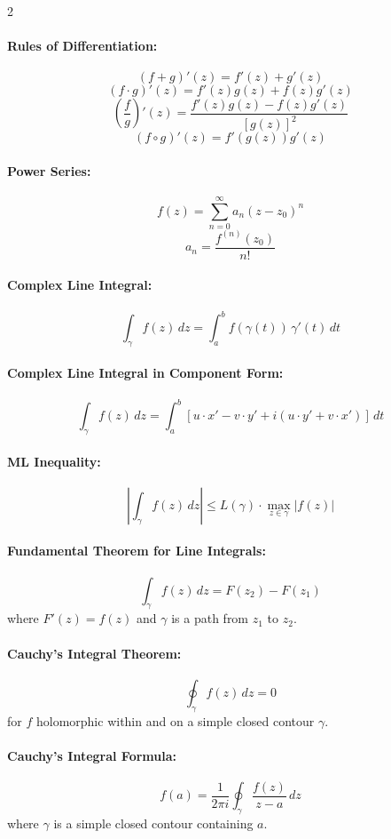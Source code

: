 \begin{multicols}{2}
\paragraph{Rules of Differentiation:}
\[
(f+g)'(z) = f'(z)+g'(z)
\]
\[
(f\cdot g)'(z) = f'(z)g(z)+f(z)g'(z)
\]
\[
\left(\frac{f}{g}\right)'(z) = \frac{f'(z)g(z)-f(z)g'(z)}{[g(z)]^2}
\]
\[
(f\circ g)'(z) = f'(g(z))g'(z)
\]

\paragraph{Power Series:}
\[
f(z) = \sum_{n=0}^{\infty} a_n (z - z_0)^n
\]
\[
a_n = \frac{f^{(n)}(z_0)}{n!}
\]

\paragraph{Complex Line Integral:}
\[
\int_{\gamma} f(z) \, dz = \int_a^b f(\gamma(t)) \, \gamma'(t) \, dt
\]

\paragraph{Complex Line Integral in Component Form:}
\[
\int_{\gamma} f(z) \, dz = \int_a^b [u \cdot x' - v \cdot y' + i(u \cdot y' + v \cdot x')] \, dt
\]

\paragraph{ML Inequality:}
\[
\left| \int_{\gamma} f(z) \, dz \right| \leq L(\gamma) \cdot \max_{z \in \gamma} |f(z)|
\]

\paragraph{Fundamental Theorem for Line Integrals:}
\[
\int_{\gamma} f(z) \, dz = F(z_2) - F(z_1)
\]
where $F'(z) = f(z)$ and $\gamma$ is a path from $z_1$ to $z_2$.

\paragraph{Cauchy's Integral Theorem:}
\[
\oint_{\gamma} f(z) \, dz = 0
\]
for $f$ holomorphic within and on a simple closed contour $\gamma$.

\paragraph{Cauchy's Integral Formula:}
\[
f(a) = \frac{1}{2\pi i} \oint_{\gamma} \frac{f(z)}{z-a} \, dz
\]
where $\gamma$ is a simple closed contour containing $a$.


\end{multicols}
